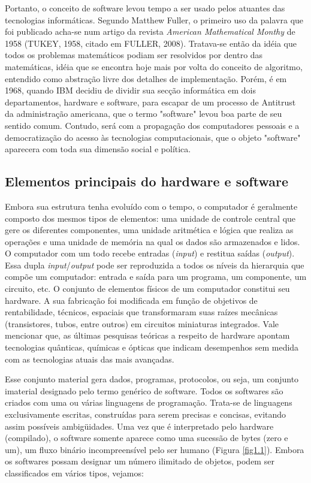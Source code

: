Portanto, o conceito de software levou tempo a ser usado pelos atuantes das tecnologias informáticas. Segundo Matthew Fuller, o primeiro uso da palavra que foi publicado acha-se num artigo da revista \emph{American Mathematical Monthy} de 1958 (TUKEY, 1958, citado em FULLER, 2008). Tratava-se então da idéia que todos os problemas matemáticos podiam ser resolvidos por dentro das matemáticas, idéia que se encontra hoje mais por volta do conceito de algoritmo, entendido como abstração livre dos detalhes de implementação. Porém, é em 1968, quando IBM decidiu de dividir sua secção informática em dois departamentos, hardware e software, para escapar de um processo de Antitrust da administração americana, que o termo "software" levou boa parte de seu sentido comum. Contudo, será com a propagação dos computadores pessoais e a democratização do acesso às tecnologias computacionais, que o objeto "software" aparecera com toda sua dimensão social e política.

\subsection{Elementos principais do hardware e software} \label{1.1.2}

Embora sua estrutura tenha evoluído com o tempo, o computador é geralmente composto dos mesmos tipos de elementos: uma unidade de controle central que gere os diferentes componentes, uma unidade aritmética e lógica que realiza as operações e uma unidade de memória na qual os dados são armazenados e lidos. O computador com um todo recebe entradas (\emph{input}) e restitua saídas (\emph{output}). Essa dupla \emph{input}/\emph{output} pode ser reproduzida a todos os níveis da hierarquia que compõe um computador: entrada e saída para um programa, um componente, um circuito, etc. O conjunto de elementos físicos de um computador constitui seu hardware. A sua fabricação foi modificada em função de objetivos de rentabilidade, técnicos, espaciais que transformaram suas raízes mecânicas (transistores, tubos, entre outros) em circuitos miniaturas integrados. Vale mencionar que, as últimas pesquisas teóricas a respeito de hardware apontam tecnologias quânticas, químicas e ópticas que indicam desempenhos sem medida com as tecnologias atuais das mais avançadas.

Esse conjunto material gera dados, programas, protocolos, ou seja, um conjunto imaterial designado pelo termo genérico de software. Todos os softwares são criados com uma ou várias linguagens de programação. Trata-se de linguagens exclusivamente escritas, construídas para serem precisas e concisas, evitando assim possíveis ambigüidades. Uma vez que é interpretado pelo hardware (compilado), o software somente aparece como uma sucessão de bytes (zero e um), um fluxo binário incompreensível pelo ser humano (Figura \ref{fig1.1}). Embora os softwares possam designar um número ilimitado de objetos, podem ser classificados em vários tipos, vejamos:

